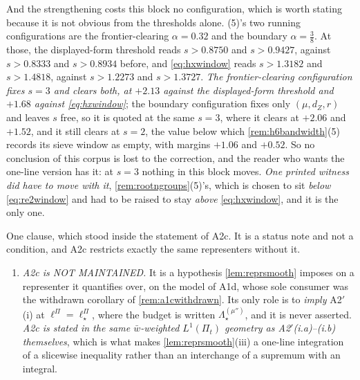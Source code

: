 \begin{remark}
\begin{enumerate}
And the strengthening costs this block no configuration, which is worth stating because it is not
obvious from the thresholds alone. \textup{(5)}'s two running configurations are
the frontier-clearing $\alpha=0.32$ and the boundary $\alpha=\tfrac38$. At those, the displayed-form
threshold reads $s>0.8750$ and $s>0.9427$, against $s>0.8333$ and $s>0.8934$ before, 
and \eqref{eq:hxwindow} reads $s>1.3182$ and $s>1.4818$, against $s>1.2273$ and $s>1.3727$. \emph{The
frontier-clearing configuration fixes $s=3$ and clears both, at $+2.13$ against the displayed-form
threshold and $+1.68$ against \eqref{eq:hxwindow}}; the boundary configuration fixes only $(\mu,d_Z,r)$ and
leaves $s$ free, so it is quoted at the same $s=3$, where it clears at $+2.06$ and $+1.52$, and it still
clears at $s=2$, the value below which \cref{rem:h6bandwidth}\textup{(5)} records its sieve window as
empty, with margins $+1.06$ and $+0.52$. So no conclusion of this corpus is lost to the
correction, and the reader who wants the one-line version has it: at $s=3$ nothing in this block moves.
\emph{One printed witness did have to move with it}, \cref{rem:rootngroups}\textup{(5)}'s, which is
chosen to sit \emph{below} \eqref{eq:re2window} and had to be raised to stay \emph{above}
\eqref{eq:hxwindow}, and it is the only one.
\end{enumerate}
\end{remark}

\begin{remark}\label{rem:reprsourceread}
One clause, which stood inside the statement of A2c. It is a status note and not a condition, and
A2c restricts exactly the same representers without it.
\begin{enumerate}
\item[(1)] \emph{A2c is NOT MAINTAINED.} It is a hypothesis \cref{lem:reprsmooth} imposes on a representer it
quantifies over, on the model of A1d, whose sole consumer was the withdrawn corollary of \cref{rem:a1cwithdrawn}. Its only role is to
\emph{imply} A2$'$(i) at $\ell^\Pi=\ell^\Pi_\star$, where the budget is written
$\Lambda^{(\mu'')}_\star$, and it is never asserted. \emph{A2c is stated in the same
$\bar w$-weighted $L^{1}(\Pi_t)$ geometry as A2$'$(i.a)--(i.b) themselves}, which is what
makes \cref{lem:reprsmooth}(iii) a one-line integration of a slicewise inequality rather than an
interchange of a supremum with an integral.
\end{enumerate}
\end{remark}

